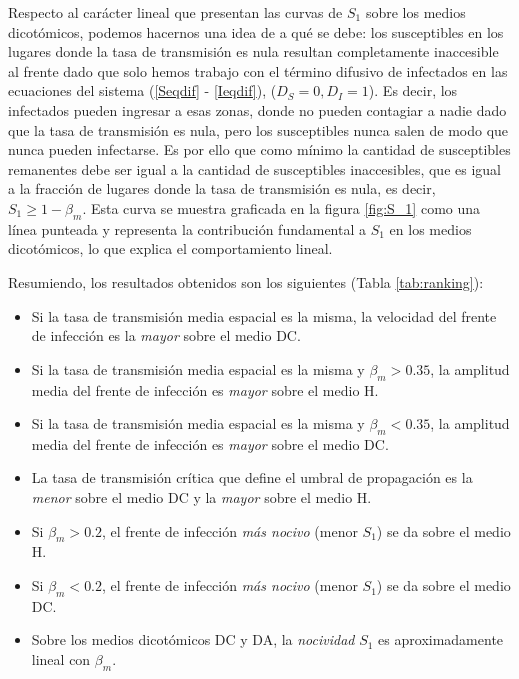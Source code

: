 Respecto al carácter lineal que presentan las curvas de $S_1$ sobre los medios dicotómicos, podemos hacernos una idea de a qué se debe: los susceptibles en los lugares donde la tasa de transmisión es nula resultan completamente inaccesible al frente dado que solo hemos trabajo con el término difusivo de infectados en las ecuaciones del sistema (\ref{Seqdif} - \ref{Ieqdif}), ($D_S = 0,D_I=1$). Es decir, los infectados pueden ingresar a esas zonas, donde no pueden contagiar a nadie dado que la tasa de transmisión es nula, pero los susceptibles nunca salen de modo que nunca pueden infectarse. Es por ello que como mínimo la cantidad de susceptibles remanentes debe ser igual a la cantidad de susceptibles inaccesibles, que es igual a la fracción de lugares donde la tasa de transmisión es nula, es decir, $S_1\geq 1-\beta_m$. Esta curva se muestra graficada en la figura \ref{fig:S_1} como una línea punteada y representa la contribución fundamental a $S_1$ en los medios dicotómicos, lo que explica el comportamiento lineal.

Resumiendo, los resultados obtenidos son los siguientes (Tabla \ref{tab:ranking}):
\begin{itemize}
    \item Si la tasa de transmisión media espacial es la misma, la velocidad del frente de infección es la \textit{mayor} sobre el medio DC.
    \item Si la tasa de transmisión media espacial es la misma y $\beta_m>0.35$, la amplitud media del frente de infección es \textit{mayor} sobre el medio H.
    \item Si la tasa de transmisión media espacial es la misma y $\beta_m<0.35$, la amplitud media del frente de infección es \textit{mayor} sobre el medio DC.
    \item La tasa de transmisión crítica que define el umbral de propagación es la \textit{menor} sobre el medio DC y la \textit{mayor} sobre el medio H.
    \item Si $\beta_m>0.2$, el frente de infección \textit{más nocivo} (menor $S_1$) se da sobre el medio H.
    \item Si $\beta_m<0.2$, el frente de infección \textit{más nocivo} (menor $S_1$) se da sobre el medio DC.
    \item Sobre los medios dicotómicos DC y DA, la \textit{nocividad} $S_1$ es aproximadamente lineal con $\beta_m$.
\end{itemize}

